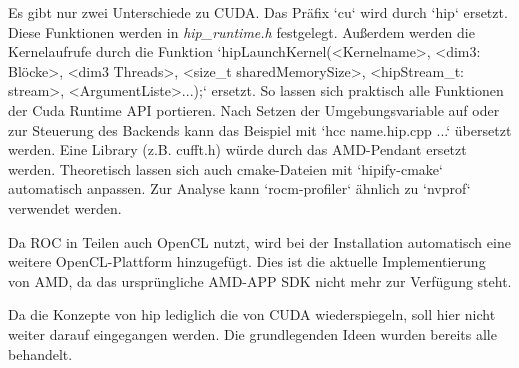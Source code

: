 	Es gibt nur zwei Unterschiede zu CUDA. Das Präfix \li`cu` wird durch \li`hip` ersetzt. Diese Funktionen werden in \textit{hip{\_}runtime.h} festgelegt. Außerdem werden die \Gls{Kernel}aufrufe durch die Funktion \li`hipLaunchKernel(<Kernelname>, <dim3: Blöcke>, <dim3 Threads>, <size_t sharedMemorySize>, <hipStream_t: stream>, <ArgumentListe>...);` ersetzt. So lassen sich praktisch alle Funktionen der Cuda Runtime \Gls{API} portieren. Nach Setzen der Umgebungsvariable auf oder zur Steuerung des Backends kann das Beispiel mit \li`hcc name.hip.cpp ...` übersetzt werden. Eine Library (z.B. cufft.h) würde durch das AMD-Pendant ersetzt werden. Theoretisch lassen sich auch cmake-Dateien mit \li`hipify-cmake` automatisch anpassen. Zur Analyse kann \li`rocm-profiler` ähnlich zu \li`nvprof` verwendet werden.
	
	Da ROC in Teilen auch OpenCL nutzt, wird bei der Installation automatisch eine weitere OpenCL-Plattform hinzugefügt. Dies ist die aktuelle Implementierung von AMD, da das ursprüngliche AMD-APP SDK nicht mehr zur Verfügung steht.
	
	Da die Konzepte von hip lediglich die von CUDA wiederspiegeln, soll hier nicht weiter darauf eingegangen werden. Die grundlegenden Ideen wurden bereits alle behandelt.